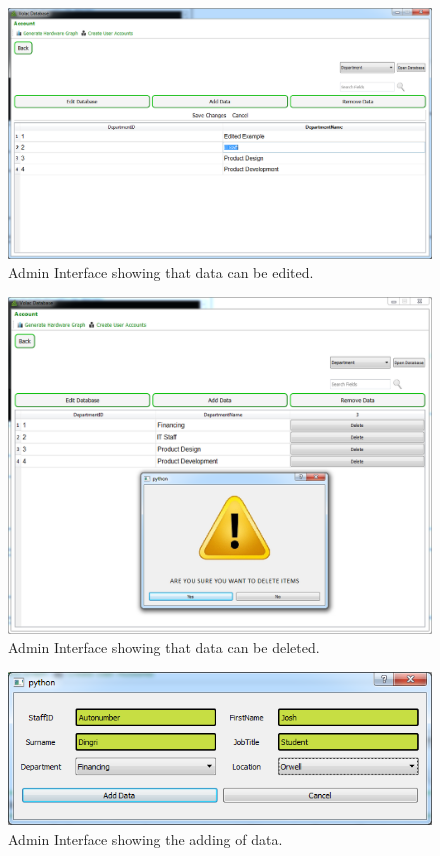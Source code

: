 \begin{figure}[H]
    \includegraphics[width=\textwidth]{./Evaluation/Images/admin2.png}
    \caption{Admin Interface showing that data can be edited.} 
\end{figure}

\begin{figure}[H]
    \includegraphics[width=\textwidth]{./Evaluation/Images/admin3.png}
    \caption{Admin Interface showing that data can be deleted.} 
\end{figure}

\begin{figure}[H]
    \includegraphics[width=\textwidth]{./Testing/Images/AddDataDataExample.png}
    \caption{Admin Interface showing the adding of data.} 
\end{figure}

